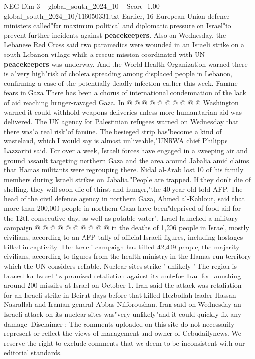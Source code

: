 \begin{textsample}{NEG Dim 3 – global\_south\_2024\_10 – Score -1.00 – global\_south\_2024\_10/116050331.txt}
Earlier, 16 European Union defence ministers called"for maximum political and diplomatic pressure on Israel"to prevent further incidents against \textbf{peacekeepers}.
Also on Wednesday, the Lebanese Red Cross said two paramedics were wounded in an Israeli strike on a south Lebanon village while a rescue mission coordinated with UN \textbf{peacekeepers} was underway.
And the World Health Organization warned there is a"very high"risk of cholera spreading among displaced people in Lebanon, confirming a case of the potentially deadly infection earlier this week.
Famine fears in Gaza There has been a chorus of international condemnation of the lack of aid reaching hunger-ravaged Gaza.
In @ @ @ @ @ @ @ @ @ @ Washington warned it could withhold weapons deliveries unless more humanitarian aid was delivered.
The UN agency for Palestinian refugees warned on Wednesday that there was"a real risk"of famine.
The besieged strip has"become a kind of wasteland, which I would say is almost unliveable,"UNRWA chief Philippe Lazzarini said.
For over a week, Israeli forces have engaged in a sweeping air and ground assault targeting northern Gaza and the area around Jabalia amid claims that Hamas militants were regrouping there.
Nidal al-Arab lost 10 of his family members during Israeli strikes on Jabalia."People are trapped.
If they don't die of shelling, they will soon die of thirst and hunger,"the 40-year-old told AFP.
The head of the civil defence agency in northern Gaza, Ahmed al-Kahlout, said that more than 200,000 people in northern Gaza have been"deprived of food aid for the 12th consecutive day, as well as potable water".
Israel launched a military campaign @ @ @ @ @ @ @ @ @ @ in the deaths of 1,206 people in Israel, mostly civilians, according to an AFP tally of official Israeli figures, including hostages killed in captivity.
The Israeli campaign has killed 42,409 people, the majority civilians, according to figures from the health ministry in the Hamas-run territory which the UN considers reliable.
Nuclear sites strike ' unlikely ' The region is braced for Israel ' s promised retaliation against its arch-foe Iran for launching around 200 missiles at Israel on October 1.
Iran said the attack was retaliation for an Israeli strike in Beirut days before that killed Hezbollah leader Hassan Nasrallah and Iranian general Abbas Nilforoushan.
Iran said on Wednesday an Israeli attack on its nuclear sites was"very unlikely"and it could quickly fix any damage.
Disclaimer : The comments uploaded on this site do not necessarily represent or reflect the views of management and owner of Cebudailynews.
We reserve the right to exclude comments that we deem to be inconsistent with our editorial standards.

\end{textsample}
